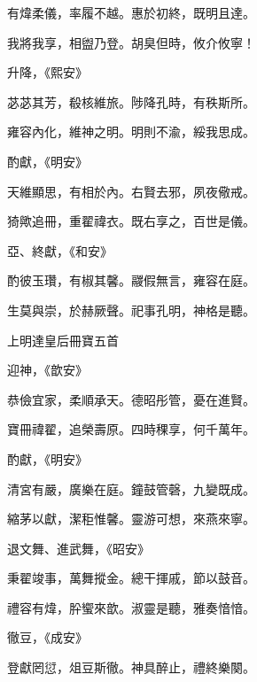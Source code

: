\begin{pinyinscope}
 有煒柔儀，率履不越。惠於初終，既明且達。



 我將我享，相盥乃登。胡臭但時，攸介攸寧！



 升降，《熙安》



 苾苾其芳，殽核維旅。陟降孔時，有秩斯所。



 雍容內化，維神之明。明則不渝，綏我思成。



 酌獻，《明安》



 天維顯思，有相於內。右賢去邪，夙夜儆戒。



 猗歟追冊，重翟禕衣。既右享之，百世是儀。



 亞、終獻，《和安》



 酌彼玉瓚，有椒其馨。鬷假無言，雍容在庭。



 生莫與崇，於赫厥聲。祀事孔明，神格是聽。



 上明達皇后冊寶五首



 迎神，《歆安》



 恭儉宜家，柔順承天。德昭彤管，憂在進賢。



 寶冊禕翟，追榮壽原。四時稞享，何千萬年。



 酌獻，《明安》



 清宮有嚴，廣樂在庭。鐘鼓管磬，九變既成。



 縮茅以獻，潔秬惟馨。靈游可想，來燕來寧。



 退文舞、進武舞，《昭安》



 秉翟竣事，萬舞摐金。總干揮戚，節以鼓音。



 禮容有煒，肸蠁來歆。淑靈是聽，雅奏愔愔。



 徹豆，《成安》



 登獻罔愆，俎豆斯徹。神具醉止，禮終樂闋。




\end{pinyinscope}
